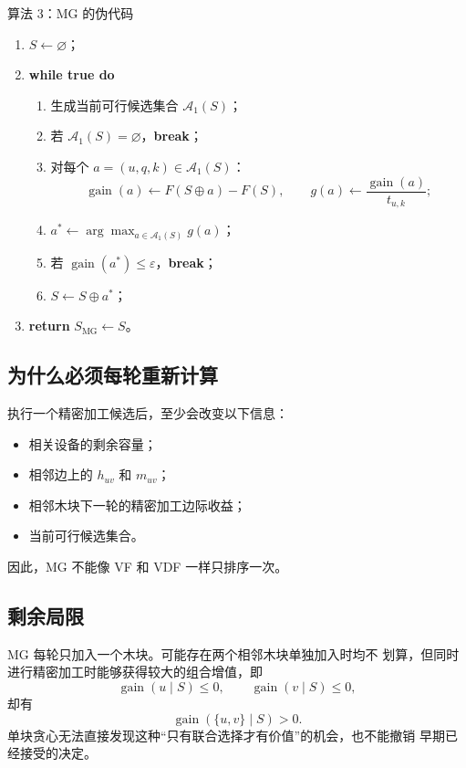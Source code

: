 \documentclass[UTF8,12pt,a4paper]{ctexart}
\newcommand{\Alg}[1]{\textsc{#1}}
\newcommand{\Aone}{\mathcal{A}_{1}}
\newcommand{\score}{g}
\newcommand{\eps}{\varepsilon}
\begin{document}
\begin{algobox}{算法 3：\Alg{MG} 的伪代码}
\begin{enumerate}[label=\arabic*.,leftmargin=2.4em]
  \item \(S\leftarrow\varnothing\)；
  \item \textbf{while true do}
        \begin{enumerate}[label*=\arabic*.,leftmargin=2.6em]
          \item 生成当前可行候选集合 \(\Aone(S)\)；
          \item 若 \(\Aone(S)=\varnothing\)，\textbf{break}；
          \item 对每个 \(a=(u,q,k)\in\Aone(S)\)：
                \[
                \operatorname{gain}(a)\leftarrow F(S\oplus a)-F(S),
                \qquad
                \score(a)\leftarrow\frac{\operatorname{gain}(a)}{t_{u,k}};
                \]
          \item \(a^*\leftarrow\arg\max_{a\in\Aone(S)}\score(a)\)；
          \item 若 \(\operatorname{gain}(a^*)\leq\eps\)，\textbf{break}；
          \item \(S\leftarrow S\oplus a^*\)；
        \end{enumerate}
  \item \textbf{return} \(S_{\mathrm{MG}}\leftarrow S\)。
\end{enumerate}
\end{algobox}

\subsection{为什么必须每轮重新计算}

执行一个精密加工候选后，至少会改变以下信息：
\begin{itemize}
  \item 相关设备的剩余容量；
  \item 相邻边上的 \(h_{uv}\) 和 \(m_{uv}\)；
  \item 相邻木块下一轮的精密加工边际收益；
  \item 当前可行候选集合。
\end{itemize}
因此，\Alg{MG} 不能像 \Alg{VF} 和 \Alg{VDF} 一样只排序一次。

\subsection{剩余局限}

\Alg{MG} 每轮只加入一个木块。可能存在两个相邻木块单独加入时均不
划算，但同时进行精密加工时能够获得较大的组合增值，即
\[
\operatorname{gain}(u\mid S)\leq0,
\qquad
\operatorname{gain}(v\mid S)\leq0,
\]
却有
\[
\operatorname{gain}(\{u,v\}\mid S)>0.
\]
单块贪心无法直接发现这种“只有联合选择才有价值”的机会，也不能撤销
早期已经接受的决定。
\end{document}
